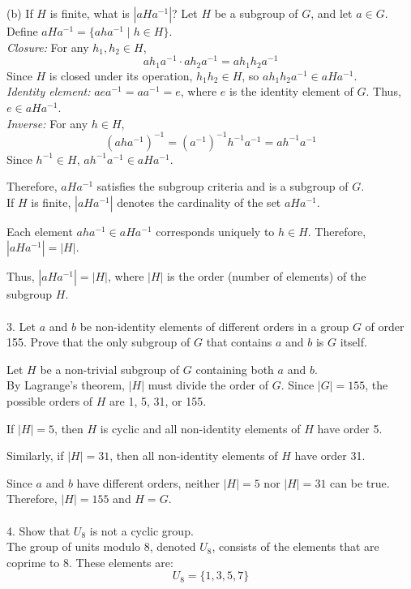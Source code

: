 {(b)} If \( H \) is finite, what is \( |aHa^{-1}| \)?
Let \( H \) be a subgroup of \( G \), and let \( a \in G \). Define \( aHa^{-1} = \{ aha^{-1} \mid h \in H \} \).
\\
\textit{Closure:} For any \( h_1, h_2 \in H \),
\[ a h_1 a^{-1} \cdot a h_2 a^{-1} = a h_1 h_2 a^{-1} \]
Since \( H \) is closed under its operation, \( h_1 h_2 \in H \), so \( a h_1 h_2 a^{-1} \in aHa^{-1} \).
\\
\textit{Identity element:} \( a e a^{-1} = a a^{-1} = e \), where \( e \) is the identity element of \( G \). Thus, \( e \in aHa^{-1} \).
\\
\textit{Inverse:} For any \( h \in H \),
\[ (aha^{-1})^{-1} = (a^{-1})^{-1} h^{-1} a^{-1} = a h^{-1} a^{-1} \]
Since \( h^{-1} \in H \), \( a h^{-1} a^{-1} \in aHa^{-1} \).

Therefore, \( aHa^{-1} \) satisfies the subgroup criteria and is a subgroup of \( G \).\\

If \( H \) is finite, \( |aHa^{-1}| \) denotes the cardinality of the set \( aHa^{-1} \).

Each element \( aha^{-1} \in aHa^{-1} \) corresponds uniquely to \( h \in H \). Therefore, \( |aHa^{-1}| = |H| \).

Thus, \( |aHa^{-1}| = |H| \), where \( |H| \) is the order (number of elements) of the subgroup \( H \).
\\
\\
3. Let \( a \) and \( b \) be non-identity elements of different orders in a group \( G \) of order 155. Prove that the only subgroup of \( G \) that contains \( a \) and \( b \) is \( G \) itself.

Let \( H \) be a non-trivial subgroup of \( G \) containing both \( a \) and \( b \).\\
By Lagrange’s theorem, \( |H| \) must divide the order of \( G \). Since \( |G| = 155 \), the possible orders of \( H \) are 1, 5, 31, or 155.

If \( |H| = 5 \), then \( H \) is cyclic and all non-identity elements of \( H \) have order 5. 

Similarly, if \( |H| = 31 \), then all non-identity elements of \( H \) have order 31.

Since \( a \) and \( b \) have different orders, neither \( |H| = 5 \) nor \( |H| = 31 \) can be true. \\
Therefore, \( |H| = 155 \) and \( H = G \).
\\
\\
4. Show that \( U_8 \) is not a cyclic group.\\
The group of units modulo 8, denoted \( U_8 \), consists of the elements that are coprime to 8. These elements are:
\[ U_8 = \{1, 3, 5, 7\} \]

